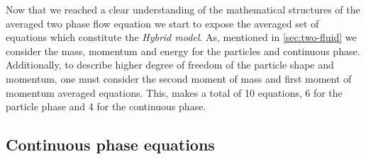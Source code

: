 
Now that we reached a clear understanding of the mathematical structures of the averaged two phase flow equation we start to expose the averaged set of equations which constitute the \textit{Hybrid model}. 
As, mentioned in \ref{sec:two-fluid} we consider the mass, momentum and energy for the particles and continuous phase. 
Additionally, to describe higher degree of freedom of the particle shape and momentum, one must consider the second moment of mass and first moment of momentum averaged equations. 
This, makes a total of 10 equations, 6 for the particle phase and 4 for the continuous phase.

\subsection{Continuous phase equations}


